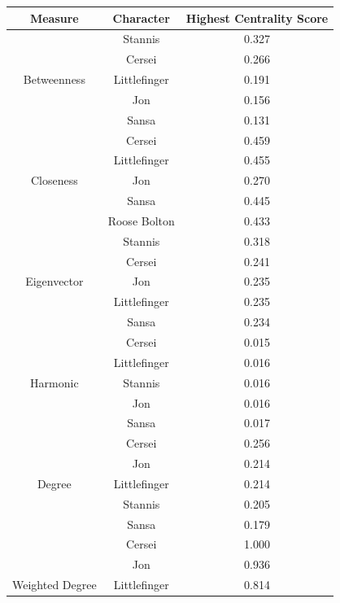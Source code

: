\documentclass[10pt,twocolumn,letterpaper]{article}
\begin{document}
\begin{table}[!h]
    \centering
    \small
    \begin{tabular}{c|c|c}
        Measure & Character & \small{Highest Centrality Score} \\
        \hline
                    & Stannis & 0.327 \\
                    & Cersei & 0.266 \\
        Betweenness & Littlefinger & 0.191 \\
                    & Jon & 0.156 \\
                    & Sansa & 0.131 \\
        \hline 
                    & Cersei & 0.459 \\
                    & Littlefinger & 0.455 \\
        Closeness   & Jon & 0.270 \\
                    & Sansa & 0.445 \\
                    & Roose Bolton & 0.433 \\
        \hline 
                    & Stannis & 0.318 \\
                    & Cersei & 0.241 \\
        Eigenvector & Jon & 0.235 \\
                    & Littlefinger & 0.235 \\
                    & Sansa & 0.234 \\
        \hline 
                    & Cersei & 0.015 \\
                    & Littlefinger & 0.016 \\
        Harmonic    & Stannis & 0.016 \\
                    & Jon & 0.016 \\
                    & Sansa & 0.017 \\
        \hline
                    & Cersei & 0.256 \\
                    & Jon & 0.214 \\
        Degree      & Littlefinger & 0.214 \\
                    & Stannis & 0.205 \\
                    & Sansa & 0.179 \\
        \hline
                    & Cersei & 1.000 \\
                    & Jon & 0.936 \\
        Weighted Degree & Littlefinger & 0.814 \\

\end{tabular}
\end{table}
\end{document}
